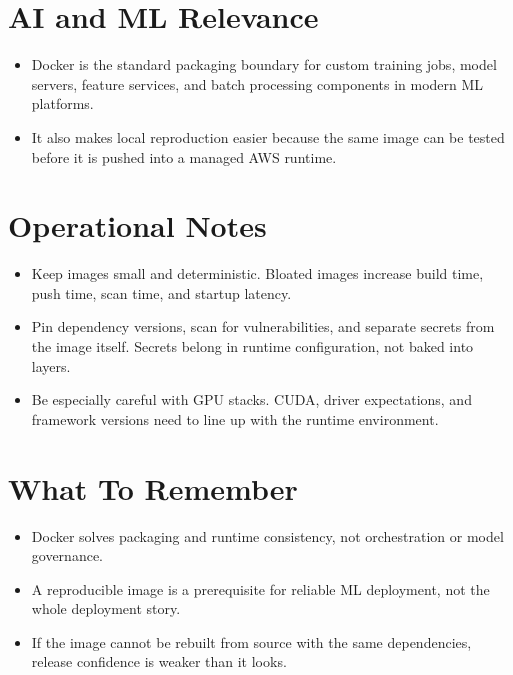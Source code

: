 \documentclass[10pt,twocolumn]{article}
\begin{document}
\section*{AI and ML Relevance}
\begin{itemize}
\item Docker is the standard packaging boundary for custom training jobs, model servers, feature services, and batch processing components in modern ML platforms.
\item It also makes local reproduction easier because the same image can be tested before it is pushed into a managed AWS runtime.
\end{itemize}

\section*{Operational Notes}
\begin{itemize}
\item Keep images small and deterministic. Bloated images increase build time, push time, scan time, and startup latency.
\item Pin dependency versions, scan for vulnerabilities, and separate secrets from the image itself. Secrets belong in runtime configuration, not baked into layers.
\item Be especially careful with GPU stacks. CUDA, driver expectations, and framework versions need to line up with the runtime environment.
\end{itemize}

\section*{What To Remember}
\begin{itemize}
\item Docker solves packaging and runtime consistency, not orchestration or model governance.
\item A reproducible image is a prerequisite for reliable ML deployment, not the whole deployment story.
\item If the image cannot be rebuilt from source with the same dependencies, release confidence is weaker than it looks.
\end{itemize}
\end{document}
